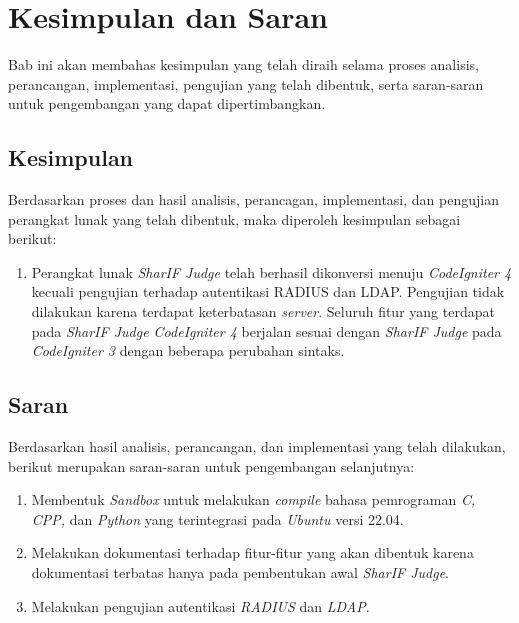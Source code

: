 \chapter{Kesimpulan dan Saran}
\label{chap:kesimpulandansaran}
Bab ini akan membahas kesimpulan yang telah diraih selama proses analisis, perancangan, implementasi, pengujian yang telah dibentuk, serta saran-saran untuk pengembangan yang dapat dipertimbangkan.
\section{Kesimpulan}
Berdasarkan proses dan hasil analisis, perancagan, implementasi, dan pengujian perangkat lunak yang telah dibentuk, maka diperoleh kesimpulan sebagai berikut:
\begin{enumerate}
	\item Perangkat lunak \textit{SharIF Judge} telah berhasil dikonversi menuju \textit{CodeIgniter 4} kecuali pengujian terhadap autentikasi RADIUS dan LDAP. Pengujian tidak dilakukan karena terdapat keterbatasan \textit{server}. Seluruh fitur yang terdapat pada \textit{SharIF Judge CodeIgniter 4} berjalan sesuai dengan \textit{SharIF Judge} pada \textit{CodeIgniter 3} dengan beberapa perubahan sintaks.
\end{enumerate}

\section{Saran}
Berdasarkan hasil analisis, perancangan, dan implementasi yang telah dilakukan, berikut merupakan saran-saran untuk pengembangan selanjutnya:
\begin{enumerate}
	\item Membentuk \textit{Sandbox} untuk melakukan \textit{compile} bahasa pemrograman \textit{C, CPP,} dan \textit{Python} yang terintegrasi pada \textit{Ubuntu} versi 22.04.
	\item Melakukan dokumentasi terhadap fitur-fitur yang akan dibentuk karena dokumentasi terbatas hanya pada pembentukan awal \textit{SharIF Judge}.
	\item Melakukan pengujian autentikasi \textit{RADIUS} dan \textit{LDAP}.
\end{enumerate}
